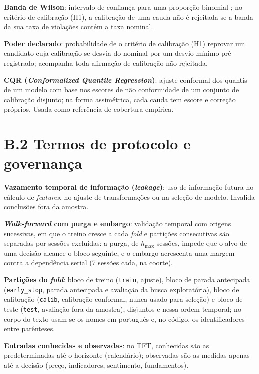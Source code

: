 \label{gl:wilson}\textbf{Banda de Wilson}: intervalo de confiança para uma proporção binomial \cite{WILSON1927,BROWN2001}; no critério de calibração (H1), a calibração de uma cauda não é rejeitada se a banda da sua taxa de violações contém a taxa nominal.

\label{gl:poder}\textbf{Poder declarado}: probabilidade de o critério de calibração (H1) reprovar um candidato cuja calibração se desvia do nominal por um desvio mínimo pré-registrado; acompanha toda afirmação de calibração não rejeitada.

\label{gl:cqr}\textbf{CQR (\textit{Conformalized Quantile Regression})}: ajuste conformal dos quantis de um modelo com base nos escores de não conformidade de um conjunto de calibração disjunto; na forma assimétrica, cada cauda tem escore e correção próprios. Usada como referência de cobertura empírica.

\section*{B.2 Termos de protocolo e governança}

\label{gl:leakage}\textbf{Vazamento temporal de informação (\textit{leakage})}: uso de informação futura no cálculo de \textit{features}, no ajuste de transformações ou na seleção de modelo. Invalida conclusões fora da amostra.

\label{gl:walkforward}\textbf{\textit{Walk-forward} com purga e embargo}: validação temporal com origens sucessivas, em que o treino cresce a cada \textit{fold} e partições consecutivas são separadas por sessões excluídas: a purga, de \(h_{\max}\) sessões, impede que o alvo de uma decisão alcance o bloco seguinte, e o embargo acrescenta uma margem contra a dependência serial (7 sessões cada, na coorte).

\label{gl:split}\textbf{Partições do \textit{fold}}: bloco de treino (\texttt{train}, ajuste), bloco de parada antecipada (\texttt{early\_stop}, parada antecipada e avaliação da busca exploratória), bloco de calibração (\texttt{calib}, calibração conformal, nunca usado para seleção) e bloco de teste (\texttt{test}, avaliação fora da amostra), disjuntos e nessa ordem temporal; no corpo do texto usam-se os nomes em português e, no código, os identificadores entre parênteses.

\label{gl:known}\textbf{Entradas conhecidas e observadas}: no TFT, conhecidas são as predeterminadas até o horizonte (calendário); observadas são as medidas apenas até a decisão (preço, indicadores, sentimento, fundamentos).

